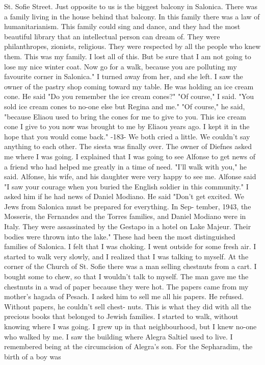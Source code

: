St. Sofie Street. Just opposite to us is the biggest balcony in Salonica. There was a family living in the house behind that balcony. In this
family there was a law of humanitarianism. This family could sing and 
dance, and they had the most beautiful library that an intellectual person can dream of. They were philanthropes, zionists, religious. They 
were respected by all the people who knew them. This was my family. I 
lost all of this. But be sure that I am not going to lose my nice winter coat. Now go for a walk, because you are polluting my favourite corner in Salonica." I turned away from her, and she left. 
I saw the owner of the pastry shop coming toward my table. He was 
holding an ice cream cone. He said "Do you remember the ice cream 
cones?" 
"Of course," I said. "You sold ice cream cones to no-one else but 
Regina and me." 
"Of course," he said, "because Eliaou used to bring the cones for me 
to give to you. This ice cream cone I give to you now was brought to me 
by Eliaou years ago. I kept it in the hope that you would come back." 
-183- 
We both cried a little. We couldn't say anything to each other. 
The siesta was finally over. The owner of Diefnes asked me where I 
was going. I explained that I was going to see Alfonse to get news of a 
friend who had helped me greatly in a time of need. 
"I'll walk with you," he said. 
Alfonse, his wife, and his daughter were very happy to see me. Alfonse said "I saw your courage when you buried the English soldier in 
this community." 
I asked him if he had news of Daniel Modiano. He said "Don't get 
excited. We Jews from Salonica must be prepared for everything. In Sep-
tember, 1943, the Mosseris, the Fernandes and the Torres families, and 
Daniel Modiano were in Italy. They were assassinated by the Gestapo in 
a hotel on Lake Majeur. Their bodies were thrown into the lake." 
These had been the most distinguished families of Salonica. I felt 
that I was choking. I went outside for some fresh air. I started to 
walk very slowly, and I realized that I was talking to myself. At the 
corner of the Church of St. Sofie there was a man selling chestnuts from 
a cart. I bought some to chew, so that I wouldn't talk to myself. 
The man gave me the chestnuts in a wad of paper because they were hot. 
The papers came from my mother's hagada of Pesach. I asked him to sell 
me all his papers. He refused. Without papers, he couldn't sell chest-
nuts. This is what they did with all the precious books that belonged to 
Jewish families. 
I started to walk, without knowing where I was going. I grew up in 
that neighbourhood, but I knew no-one who walked by me. I saw the building where Alegra Saltiel used to live. I remembered being at the circumcision of Alegra's son. For the Sepharadim, the birth of a boy was 
